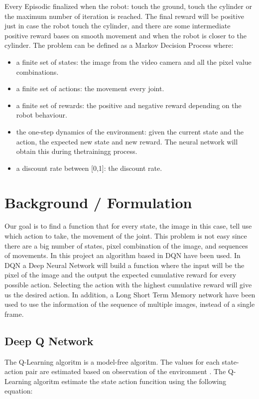 \documentclass[10pt,journal,compsoc]{IEEEtran}
\begin{document}
Every Episodic finalized when the robot: touch the ground, touch the cylinder or the maximum number of iteration is reached. The final reward will be positive just in case the robot touch the cylinder, and there are some intermediate positive reward bases on smooth movement and when the robot is closer to the cylinder. The problem can be defined as a Markov Decision Process \cite{udacity} where:
\begin{itemize}
\item a finite set of states: the image from the video camera and all the pixel value combinations.
\item a finite set of actions: the movement every joint.
\item a finite set of rewards: the positive and negative reward depending on the robot behaviour.
\item the one-step dynamics of the environment: given the current state and the action, the expected new state and new reward. The neural network will obtain this during thetrainingg process.
\item a discount rate between [0,1]: the discount rate.
\end{itemize}

\label{sec:introduction}

\section{Background / Formulation}

Our goal is to find a function that for every state, the image in this case, tell use which action to take, the movement of the joint. This problem is not easy since there are a big number of states, pixel combination of the image, and sequences of movements. In this project an algorithm based in DQN have been used. In DQN a Deep Neural Network will build a function where the input will be the pixel of the image and the output the expected cumulative reward for every possible action. Selecting the action with the highest cumulative reward will give us the desired action. In addition, a Long Short Term Memory network have been used to use the information of the sequence of multiple images, instead of a single frame.

\subsection{Deep Q Network}

The Q-Learning algoritm is a model-free algoritm. The values for each state-action pair are estimated based on observation of the environment \cite{deepreinforcementlearning}. The Q-Learning algoritm estimate the state action funcition using the following equation:
\end{document}
